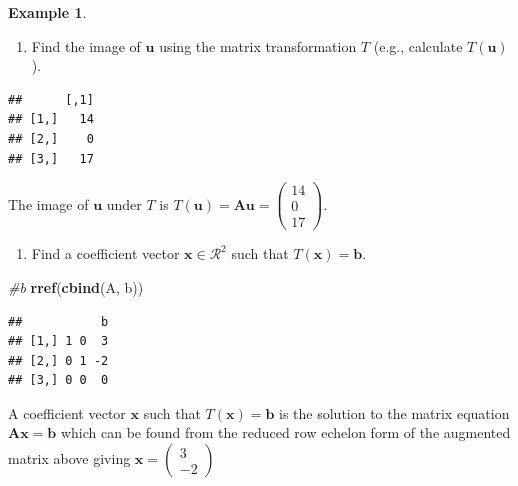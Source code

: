 \documentclass[
]{book}
\newenvironment{Shaded}{\begin{snugshade}}{\end{snugshade}}
\newcommand{\CommentTok}[1]{\textcolor[rgb]{0.56,0.35,0.01}{\textit{#1}}}
\newcommand{\KeywordTok}[1]{\textcolor[rgb]{0.13,0.29,0.53}{\textbf{#1}}}
\newcommand{\NormalTok}[1]{#1}
\newcommand{\OperatorTok}[1]{\textcolor[rgb]{0.81,0.36,0.00}{\textbf{#1}}}
\newcommand{\StringTok}[1]{\textcolor[rgb]{0.31,0.60,0.02}{#1}}
\providecommand{\tightlist}{%
  \setlength{\itemsep}{0pt}\setlength{\parskip}{0pt}}
\theoremstyle{definition}
\theoremstyle{definition}
\newtheorem{example}{Example}[chapter]
\theoremstyle{definition}
\theoremstyle{definition}
\theoremstyle{remark}
\begin{document}
\begin{example}
\begin{enumerate}
\def\labelenumi{\alph{enumi})}
\tightlist
\item
  Find the image of \(\mathbf{u}\) using the matrix transformation \(T\) (e.g., calculate \(T(\mathbf{u})\)).
\end{enumerate}

\begin{Shaded}
\end{Shaded}

\begin{verbatim}
##      [,1]
## [1,]   14
## [2,]    0
## [3,]   17
\end{verbatim}

The image of \(\mathbf{u}\) under \(T\) is \(T(\mathbf{u}) = \mathbf{A} \mathbf{u} = \begin{pmatrix} 14 \\ 0 \\ 17 \end{pmatrix}\).

\begin{enumerate}
\def\labelenumi{\alph{enumi})}
\setcounter{enumi}{1}
\tightlist
\item
  Find a coefficient vector \(\mathbf{x} \in \mathcal{R}^2\) such that \(T(\mathbf{x}) = \mathbf{b}\).
\end{enumerate}

\begin{Shaded}
\begin{Highlighting}[]
\CommentTok{#b}
\KeywordTok{rref}\NormalTok{(}\KeywordTok{cbind}\NormalTok{(A, b))}
\end{Highlighting}
\end{Shaded}

\begin{verbatim}
##           b
## [1,] 1 0  3
## [2,] 0 1 -2
## [3,] 0 0  0
\end{verbatim}

A coefficient vector \(\mathbf{x}\) such that \(T(\mathbf{x}) = \mathbf{b}\) is the solution to the matrix equation \(\mathbf{A} \mathbf{x} = \mathbf{b}\) which can be found from the reduced row echelon form of the augmented matrix above giving \(\mathbf{x} = \begin{pmatrix} 3 \\ -2 \end{pmatrix}\)


\end{example}
\end{document}
